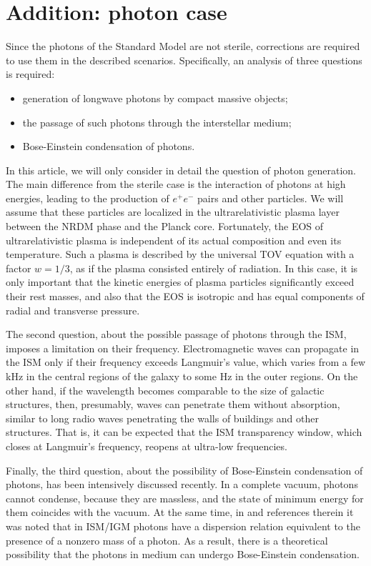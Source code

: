 \documentclass{article}
\begin{document}
\section {Addition: photon case} \label {sec3}

Since the photons of the Standard Model are not sterile, corrections are required to use them in the  described scenarios. Specifically, an analysis of three questions is required:

\begin {itemize}
\item generation of longwave photons by compact massive objects;
\item the passage of such photons through the interstellar medium;
\item Bose-Einstein condensation of photons.
\end {itemize}

In this article, we will only consider in detail the question of photon generation. The main difference from the sterile case is the interaction of photons at high energies, leading to the production of $ e ^ + e ^ - $ pairs and other particles. We will assume that these particles are localized in the ultrarelativistic plasma layer between the NRDM phase and the Planck core. Fortunately, the EOS of ultrarelativistic plasma is independent of its actual composition and even its temperature. Such a plasma is described by the universal TOV equation with a factor $ w = 1/3 $, as if the plasma consisted entirely of radiation. In this case, it is only important that the kinetic energies of plasma particles significantly exceed their rest masses, and also that the EOS is isotropic and has equal components of radial and transverse pressure.

The second question, about the possible passage of photons through the ISM, imposes a limitation on their frequency. Electromagnetic waves can propagate in the ISM only if their frequency exceeds Langmuir's value, which varies from a few kHz in the central regions of the galaxy to some Hz in the outer regions. On the other hand, if the wavelength becomes comparable to the size of galactic structures, then, presumably, waves can penetrate them without absorption, similar to long radio waves penetrating the walls of buildings and other structures. That is, it can be expected that the ISM transparency window, which closes at Langmuir's frequency, reopens at ultra-low frequencies.

Finally, the third question, about the possibility of Bose-Einstein condensation of photons, has been intensively discussed recently. In a complete vacuum, photons cannot condense, because they are massless, and the state of minimum energy for them coincides with the vacuum. At the same time, in \cite {1305.1210} and references therein it was noted that in ISM/IGM photons have a dispersion relation equivalent to the presence of a nonzero mass of a photon. As a result, there is a theoretical possibility that the photons in medium can undergo Bose-Einstein condensation.
\end{document}
